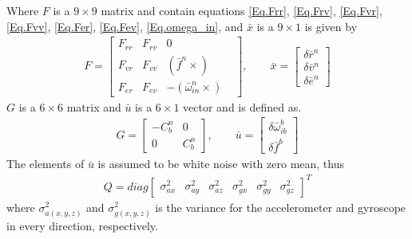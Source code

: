 Where $F$ is a $9\times 9$ matrix and contain equations \eqref{Eq.Frr}, \eqref{Eq.Frv}, \eqref{Eq.Fvr}, \eqref{Eq.Fvv}, \eqref{Eq.Fer}, \eqref{Eq.Fev}, \eqref{Eq.omega_in}, and $\bar{x}$ is a $9 \times 1$ is given by
\begin{align}
F=
\begin{bmatrix}
F_{rr} & F_{rv} & 0 &\\
F_{vr} & F_{vv} & (\bar{f}^n \times)\\
F_{er} & F_{ev} & -(\bar{\omega}_{in}^n\times)
\end{bmatrix},
\qquad
\bar{x}=
\begin{bmatrix}
\delta\bar{r}^n \\
\delta\bar{v}^n\\
\delta\bar{e}^n
\end{bmatrix}
\end{align}
$G$ is a $6\times6$ matrix and $\bar{u}$ is a $6 \times 1$ vector and is defined as.
\begin{align}
G=
\begin{bmatrix}
-C_b^n & 0 \\
0 & C_b^n
\end{bmatrix},
\qquad
\bar{u}=
\begin{bmatrix}
\delta \bar{\omega}_{ib}^b \\
\delta \bar{f}^b 
\end{bmatrix}
\end{align}
The elements of $\bar{u}$ is assumed to be white noise with zero mean, thus
\begin{align}
Q=diag
\begin{bmatrix}
\sigma^2_{ax} & \sigma^2_{ay} & \sigma^2_{az} & \sigma^2_{gx} & \sigma^2_{gy} & \sigma^2_{gz}
\end{bmatrix}^T
\label{Eq.Q}
\end{align}
where $\sigma^2_{a(x,y,z)}$ and $\sigma^2_{g(x,y,z)}$ is the variance for the accelerometer and gyroscope in every direction, respectively.
	
